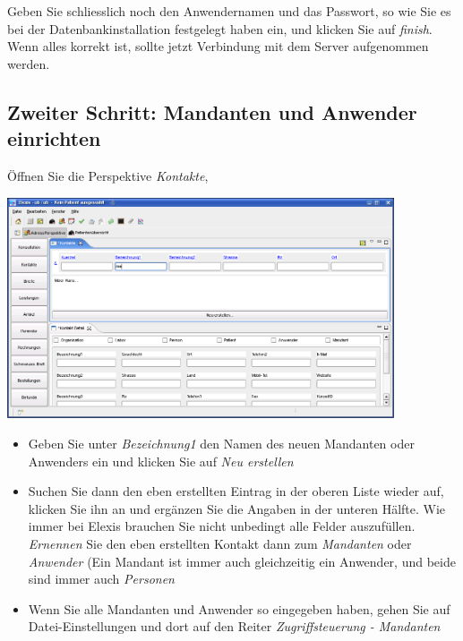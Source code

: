 Geben Sie schliesslich noch den Anwendernamen und das Passwort, so wie Sie es bei der Datenbankinstallation festgelegt haben ein, und klicken Sie auf \textit{finish}.
 Wenn alles korrekt ist, sollte jetzt Verbindung mit dem Server aufgenommen werden.

\subsection{Zweiter Schritt: Mandanten und Anwender einrichten}
Öffnen Sie die Perspektive \textit{Kontakte},

\includegraphics[width=4.5in]{images/grundkonfkonta.png}
\begin{itemize}
 \item Geben Sie unter \textit{Bezeichnung1} den Namen des neuen Mandanten oder Anwenders ein und klicken Sie auf
 \textit{Neu erstellen}
 \item Suchen Sie dann den eben erstellten Eintrag in der oberen Liste wieder auf, klicken Sie ihn an und ergänzen Sie 
 die Angaben in der unteren Hälfte. Wie immer bei Elexis brauchen Sie nicht unbedingt alle Felder auszufüllen. 
 \textit{Ernennen} Sie den eben erstellten Kontakt dann zum \textit{Mandanten} oder \textit{Anwender} (Ein Mandant ist 
 immer auch gleichzeitig ein Anwender, und beide sind immer auch \textit{Personen}
 \item Wenn Sie alle Mandanten und Anwender so eingegeben haben, gehen Sie auf Datei-Einstellungen und dort auf den 
 Reiter \textit{Zugriffsteuerung - Mandanten}
\end{itemize}

